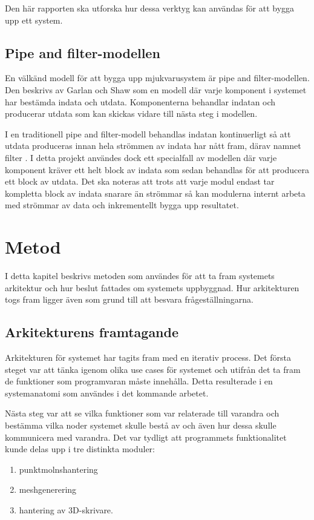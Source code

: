 Den här rapporten ska utforska hur dessa verktyg kan användas för att bygga upp ett system.

\subsection{Pipe and filter-modellen}
En välkänd modell för att bygga upp mjukvarusystem är pipe and filter-modellen. Den beskrivs av Garlan och Shaw \cite{garlan1993introduction} som en modell där varje komponent i systemet har bestämda indata och utdata. Komponenterna behandlar indatan och producerar utdata som kan skickas vidare till nästa steg i modellen.

I en traditionell pipe and filter-modell behandlas indatan kontinuerligt så att utdata produceras innan hela strömmen av indata har nått fram, därav namnet filter \cite{garlan1993introduction}. I detta projekt användes dock ett specialfall av modellen där varje komponent kräver ett helt block av indata som sedan behandlas för att producera ett block av utdata. Det ska noteras att trots att varje modul endast tar kompletta block av indata snarare än strömmar så kan modulerna internt arbeta med strömmar av data och inkrementellt bygga upp resultatet.


\section{Metod}
\label{sec:method-lundberg}
I detta kapitel beskrivs metoden som användes för att ta fram systemets arkitektur och hur beslut fattades om systemets uppbyggnad. Hur arkitekturen togs fram ligger även som grund till att besvara frågeställningarna.

\subsection{Arkitekturens framtagande}
Arkitekturen för systemet har tagits fram med en iterativ process. Det första steget var att tänka igenom olika use cases för systemet och utifrån det ta fram de funktioner som programvaran måste innehålla. Detta resulterade i en systemanatomi som användes i det kommande arbetet.

Nästa steg var att se vilka funktioner som var relaterade till varandra och bestämma vilka noder systemet skulle bestå av och även hur dessa skulle kommunicera med varandra. Det var tydligt att programmets funktionalitet kunde delas upp i tre distinkta moduler:

\begin{enumerate}
	\item punktmolnshantering
	
	\item meshgenerering
	
	\item hantering av 3D-skrivare.
\end{enumerate}

